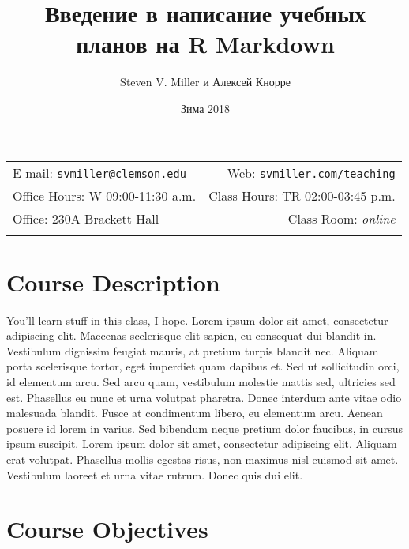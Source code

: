 \documentclass[]{article}
\title{Введение в написание учебных планов на R Markdown}
\author{Steven V. Miller и Алексей Кнорре}
\date{Зима 2018}
\begin{document}
  

		\maketitle
		
	
		\thispagestyle{firststyle}



	\noindent \begin{tabular*}{\textwidth}{ @{\extracolsep{\fill}} lr @{\extracolsep{\fill}}}


E-mail: \texttt{\href{mailto:svmiller@clemson.edu}{\nolinkurl{svmiller@clemson.edu}}} & Web: \href{http://svmiller.com/teaching}{\tt svmiller.com/teaching}\\
Office Hours: W 09:00-11:30 a.m.  &  Class Hours: TR 02:00-03:45 p.m.\\
Office: 230A Brackett Hall  & Class Room: \emph{online}\\
	&  \\
	\hline
	\end{tabular*}
	
\vspace{2mm}
	


\section{Course Description}\label{course-description}

You'll learn stuff in this class, I hope. Lorem ipsum dolor sit amet,
consectetur adipiscing elit. Maecenas scelerisque elit sapien, eu
consequat dui blandit in. Vestibulum dignissim feugiat mauris, at
pretium turpis blandit nec. Aliquam porta scelerisque tortor, eget
imperdiet quam dapibus et. Sed ut sollicitudin orci, id elementum arcu.
Sed arcu quam, vestibulum molestie mattis sed, ultricies sed est.
Phasellus eu nunc et urna volutpat pharetra. Donec interdum ante vitae
odio malesuada blandit. Fusce at condimentum libero, eu elementum arcu.
Aenean posuere id lorem in varius. Sed bibendum neque pretium dolor
faucibus, in cursus ipsum suscipit. Lorem ipsum dolor sit amet,
consectetur adipiscing elit. Aliquam erat volutpat. Phasellus mollis
egestas risus, non maximus nisl euismod sit amet. Vestibulum laoreet et
urna vitae rutrum. Donec quis dui elit.

\section{Course Objectives}\label{course-objectives}
\end{document}
